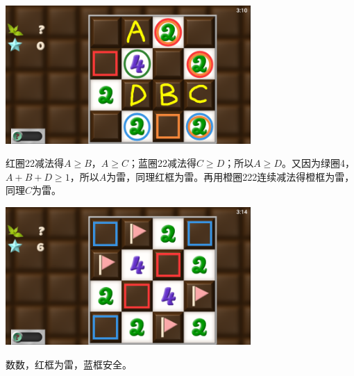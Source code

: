 \subsection{} %
\begin{center}
    \includegraphics[width=0.7\textwidth]{puzzle/52-1.png}
\end{center}
红圈22减法得$A\ge B$，$A\ge C$；蓝圈22减法得$C\ge D$；所以$A\ge D$。又因为绿圈4，$A+B+D\ge 1$，所以$A$为雷，同理红框为雷。再用橙圈222连续减法得橙框为雷，同理$C$为雷。
\begin{center}
    \includegraphics[width=0.7\textwidth]{puzzle/52-2.png}
\end{center}
数数，红框为雷，蓝框安全。

